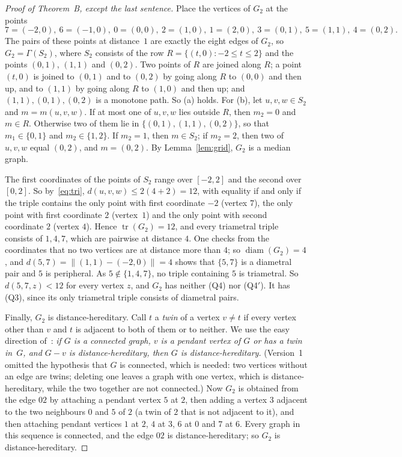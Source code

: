 \documentclass[11pt]{article}
\theoremstyle{remark}
\DeclareMathOperator{\diam}{diam}
\DeclareMathOperator{\tr}{tr}
\newcommand{\QA}{\textup{(Q3)}}
\newcommand{\QB}{\textup{(Q4)}}
\newcommand{\QBp}{\textup{(Q4$'$)}}
\begin{document}
\begin{proof}[Proof of Theorem~B, except the last sentence]
Place the vertices of $G_2$ at the points
\[
 7=(-2,0),\ 6=(-1,0),\ 0=(0,0),\ 2=(1,0),\ 1=(2,0),\ 3=(0,1),\ 5=(1,1),\ 4=(0,2).
\]
The pairs of these points at distance~$1$ are exactly the eight edges of
$G_2$, so $G_2=\Gamma(S_2)$, where $S_2$ consists of the row
$R=\{(t,0):-2\le t\le2\}$ and the points $(0,1)$, $(1,1)$ and $(0,2)$. Two
points of $R$ are joined along $R$; a point $(t,0)$ is joined to $(0,1)$ and to
$(0,2)$ by going along $R$ to $(0,0)$ and then up, and to $(1,1)$ by going
along $R$ to $(1,0)$ and then up; and $(1,1),(0,1),(0,2)$ is a monotone path.
So (a) holds. For (b), let $u,v,w\in S_2$ and $m=m(u,v,w)$. If at most one of
$u,v,w$ lies outside $R$, then $m_2=0$ and $m\in R$. Otherwise two of them lie
in $\{(0,1),(1,1),(0,2)\}$, so that $m_1\in\{0,1\}$ and $m_2\in\{1,2\}$. If
$m_2=1$, then $m\in S_2$; if $m_2=2$, then two of $u,v,w$ equal $(0,2)$, and
$m=(0,2)$. By Lemma~\ref{lem:grid}, $G_2$ is a median graph.

The first coordinates of the points of $S_2$ range over $[-2,2]$ and the
second over $[0,2]$. So by~\eqref{eq:tri}, $d(u,v,w)\le2(4+2)=12$, with
equality if and only if the triple contains the only point with first
coordinate $-2$ (vertex $7$), the only point with first coordinate $2$
(vertex~$1$) and the only point with second coordinate $2$ (vertex $4$). Hence
$\tr(G_2)=12$, and every triametral triple consists of $1,4,7$, which are
pairwise at distance $4$. One checks from the coordinates that no two vertices
are at distance more than $4$; so $\diam(G_2)=4$, and
$d(5,7)=\|(1,1)-(-2,0)\|=4$ shows that $\{5,7\}$ is a diametral pair and $5$ is
peripheral. As $5\notin\{1,4,7\}$, no triple containing $5$ is triametral. So
$d(5,7,z)<12$ for every vertex $z$, and $G_2$ has neither \QB{} nor \QBp. It has \QA, since its only triametral triple
consists of diametral pairs.

Finally, $G_2$ is distance-hereditary. Call $t$ a \emph{twin} of a vertex
$v\ne t$ if every vertex other than $v$ and $t$ is adjacent to both of them
or to neither. We use the easy direction of~\cite[Theorem~1]{bm}: \emph{if
$G$ is a connected graph, $v$ is a pendant vertex of $G$ or has a twin
in~$G$, and $G-v$ is distance-hereditary, then $G$ is distance-hereditary.}
(Version~1 omitted the hypothesis that $G$ is connected, which is needed: two
vertices without an edge are twins; deleting one leaves a graph with one
vertex, which is distance-hereditary, while the two together are not
connected.) Now $G_2$ is obtained from the edge $02$
by attaching a pendant vertex $5$ at $2$, then adding a vertex $3$ adjacent to
the two neighbours $0$ and $5$ of $2$ (a twin of $2$ that is not adjacent
to it), and then attaching
pendant vertices $1$ at $2$, $4$ at $3$, $6$ at $0$ and $7$ at $6$. Every graph
in this sequence is connected, and the edge $02$ is distance-hereditary; so
$G_2$ is distance-hereditary.
\end{proof}
\end{document}
